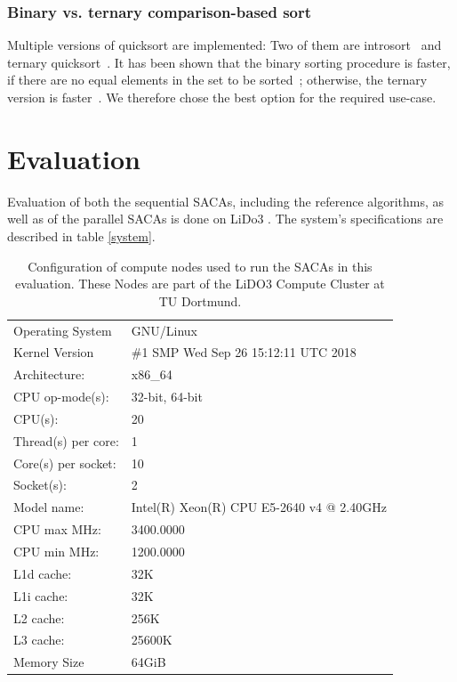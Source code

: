 \subsubsection{Binary vs. ternary comparison-based sort}

Multiple versions of quicksort are implemented:
Two of them are introsort~\cite{Musser97} and ternary quicksort~\cite{ternary_quicksort}.
It has been shown that the binary sorting procedure is faster,
if there are no equal elements in the set to be sorted~\cite{saca:4,ternary_quicksort};
otherwise, the ternary version is faster~\cite{ternary_quicksort}.
We therefore chose the best option for the required use-case.

\section{Evaluation}

Evaluation of both the sequential SACAs, including the reference algorithms, as well as of the parallel SACAs is done on LiDo3 . The system's specifications are described in table \ref{system}.

\begin{table}
\begin{tabular}{ll}
\toprule
Operating System       & GNU/Linux \\
Kernel Version       & \#1 SMP Wed Sep 26 15:12:11 UTC 2018 \\
\midrule
Architecture:        & x86\_64 \\
CPU op-mode(s):      & 32-bit, 64-bit \\
CPU(s):              & 20 \\
Thread(s) per core:  & 1 \\
Core(s) per socket:  & 10 \\
Socket(s):           & 2 \\
Model name:          & Intel(R) Xeon(R) CPU E5-2640 v4 @ 2.40GHz \\
CPU max MHz:         & 3400.0000 \\
CPU min MHz:         & 1200.0000 \\
L1d cache:           & 32K \\
L1i cache:           & 32K \\
L2 cache:            & 256K \\
L3 cache:            & 25600K \\
\midrule
Memory Size        & 64GiB \\
\bottomrule
\end{tabular}
\caption{Configuration of compute nodes used to run the SACAs in this evaluation. These Nodes are part of the LiDO3 Compute Cluster at TU Dortmund.}
\label{ea:lido}
\end{table}

